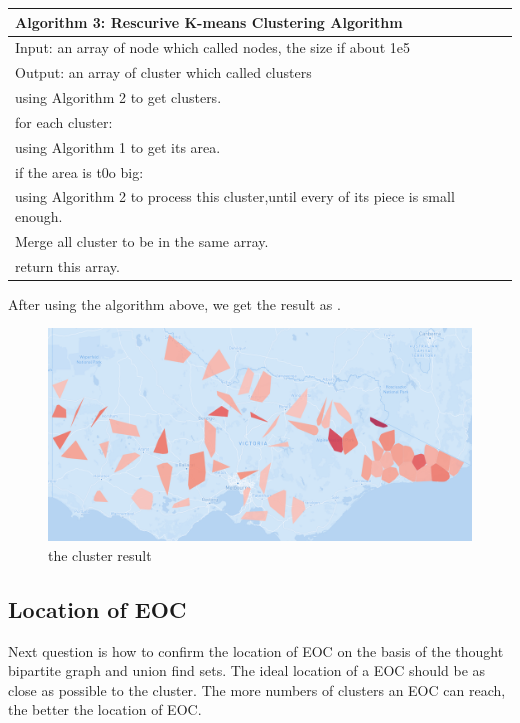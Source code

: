 \documentclass{mcmthesis}
\begin{document}
\begin{tabular}{l}
	\hline
	Algorithm 3: Rescurive K-means Clustering Algorithm \\
	\hline
	Input: an array of node which called nodes, the size if about 1e5\\
	Output: an array of cluster which called clusters\\
	using Algorithm 2 to get clusters. \\
	for each cluster: \\
	\qquad using Algorithm 1 to get its area. \\
	\qquad if the area is t0o big: \\ 
	\qquad \qquad using Algorithm 2 to process this cluster,until every of its piece is small enough. \\
	Merge all cluster to be in the same array. \\
	return this array. \\
	\hline
\end{tabular}

After using the algorithm above, we get the result as .

\begin{figure}[h]
	\small
	\centering
	\includegraphics[width=0.7\linewidth]{Figure/Cluster.png}
	\caption{the cluster result} \label{fig:Cluster}
\end{figure}
\subsection{Location of EOC}
Next question is how to conﬁrm the location of EOC on the basis of the thought bipartite graph and union ﬁnd sets.\cite{shakhatreh2018optimal}
The ideal location of a EOC should be as close as possible to the cluster. The more numbers of clusters an EOC can reach, the better the location of EOC.
\end{document}
